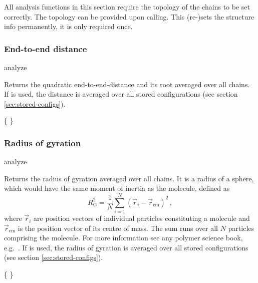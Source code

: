 All analysis functions in this section require the topology of the
chains to be set correctly.  The topology can be provided upon
calling. This (re-)sets the structure info permanently, \ie it is only
required once.

\subsubsection{End-to-end distance}

\begin{essyntax}
  analyze  
\end{essyntax}
Returns the quadratic end-to-end-distance and its root averaged over
all chains.  If  is used, the distance is averaged over all
stored configurations (see section \vref{sec:stored-configs}).

\begin{code}
\{     \}
\end{code}

\subsubsection{Radius of gyration}

\begin{essyntax}
  analyze  
\end{essyntax}
Returns the radius of gyration averaged over all chains. It is a radius
of a sphere, which would have the same moment of inertia as the molecule, 
defined as
\begin{equation}
\label{eq:Rg}
R_{\mathrm G}^2 = \frac{1}{N} \sum\limits_{i=1}^{N} \left(\vec r_i - \vec r_{\mathrm{cm}}\right)^2\,,
\end{equation}
where $\vec r_i$ are position vectors of individual particles constituting a molecule
and $\vec r_{\mathrm{cm}}$ is the position vector of its centre of mass. The sum runs
over all $N$ particles comprising the molecule. For more information see
any polymer science book, e.g.~\cite{rubinstein03a}.
If  is used, the radius of gyration is averaged over all stored
configurations (see section \vref{sec:stored-configs}).

\begin{code}
\{     \}
\end{code}

